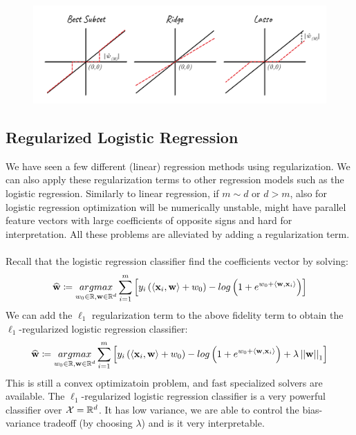 \begin{figure}[!h]
	\centering
	\includegraphics[width=1\textwidth]{chapters/regularization.model.selection/figures/6.2.png}
	\caption{}
\end{figure}

\subsection{Regularized Logistic Regression}
We have seen a few different (linear) regression methods using regularization. We can also apply these regularization terms to other regression models such as the logistic regression. Similarly to linear regression, if $m\sim d$ or $d>m$, also for logistic regression optimization will be numerically unstable, might have parallel feature vectors with large coefficients of opposite signs and hard for interpretation. All these problems are alleviated by adding a regularization term.
\\~\\
Recall that the logistic regression classifier find the coefficients vector by solving:
$$ \widehat{\mathbf{w}} \coloneqq \underset{w_0\in\mathbb{R},\mathbf{w}\in\mathbb{R}^d}{argmax}\sum^m_{i=1}\left[y_i\left(\left\langle \mathbf{x}_i,\mathbf{w}\right\rangle+w_0\right)-log\left(1+e^{w_0+\left\langle \mathbf{w},\mathbf{x}_i\right\rangle}\right)\right]$$
We can add the $\ell_1$ regularization term to the above fidelity term to obtain the $\ell_1$-regularized logistic regression classifier:
$$ \widehat{\mathbf{w}} \coloneqq \underset{w_0\in\mathbb{R},\mathbf{w}\in\mathbb{R}^d}{argmax}\sum^m_{i=1}\left[y_i\left(\left\langle \mathbf{x}_i,\mathbf{w}\right\rangle+w_0\right)-log\left(1+e^{w_0+\left\langle \mathbf{w},\mathbf{x}_i\right\rangle}\right) + \lambda \left|\left| \mathbf{w}\right|\right|_1\right]$$
This is still a convex optimizatoin problem, and fast specialized solvers are available. The $\ell_1$-regularized logistic regression classifier is a very powerful classifier over $\mathcal{X}=\mathbb{R}^d$. It has low variance, we are able to control the bias-variance tradeoff (by choosing $\lambda$) and is it very interpretable.

